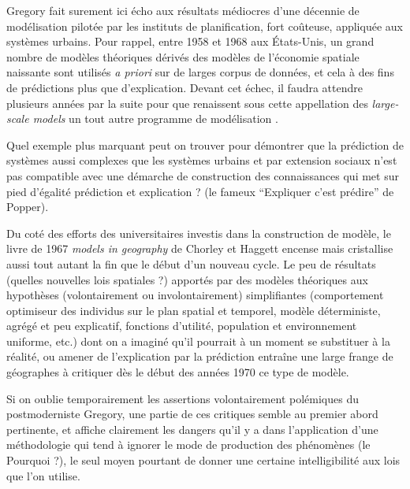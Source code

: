 Gregory fait surement ici écho aux résultats médiocres \autocite{Lee1973} d'une décennie de modélisation pilotée par les instituts de planification, fort coûteuse, appliquée aux systèmes urbains. Pour rappel, entre 1958 et 1968 aux États-Unis, un grand nombre de modèles théoriques \autocite[7-9]{Batty1979} dérivés des modèles de l'économie spatiale naissante sont utilisés \textit{a priori} sur de larges corpus de données, et cela à des fins de prédictions plus que d'explication. Devant cet échec, il faudra attendre plusieurs années par la suite pour que renaissent sous cette appellation des \textit{large-scale models} un tout autre programme de modélisation \autocite{Boyce1988}.

Quel exemple plus marquant peut on trouver pour démontrer que la prédiction de systèmes aussi complexes que les systèmes urbains et par extension sociaux n'est pas compatible avec une démarche de construction des connaissances qui met sur pied d'égalité prédiction et explication ? (le fameux \enquote{Expliquer c'est prédire} de Popper).

Du coté des efforts des universitaires investis dans la construction de modèle, le livre de 1967 \textit{models in geography} de Chorley et Haggett encense mais cristallise aussi \textcite{Golledge2006} tout autant la fin que le début d'un nouveau cycle. Le peu de résultats (quelles nouvelles lois spatiales ?) apportés par des modèles théoriques aux hypothèses (volontairement ou involontairement) simplifiantes (comportement optimiseur des individus sur le plan spatial et temporel, modèle déterministe, agrégé et peu explicatif, fonctions d'utilité, population et environnement uniforme, etc.) dont on a imaginé qu'il pourrait à un moment se substituer à la réalité, ou amener de l'explication par la prédiction \autocite[41]{Gregory1978} entraîne une large frange de géographes à critiquer dès le début des années 1970 ce type de modèle.

Si on oublie temporairement les assertions volontairement polémiques du postmoderniste Gregory, une partie de ces critiques semble au premier abord pertinente, et affiche clairement les dangers qu'il y a dans l'application d'une méthodologie qui tend à ignorer le mode de production des phénomènes (le Pourquoi ?), le seul moyen pourtant de donner une certaine intelligibilité aux lois que l'on utilise. \autocite[14-15]{Besse2000}


